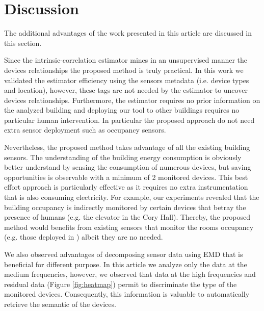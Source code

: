 \section{Discussion}
The additional advantages of the work presented in this article are discussed in this section.

Since the intrinsic-correlation estimator mines in an unsupervised manner the devices relationships the proposed method is truly practical. 
In this work we validated the estimator efficiency using the sensors metadata (i.e. device types and location), however, these tags are not needed by the estimator to uncover devices relationships.
Furthermore, the estimator requires no prior information on the analyzed building and deploying our tool to other buildings requires no particular human intervention.
In particular the proposed approach do not need extra sensor deployment such as occupancy sensors. 

Nevertheless, the proposed method takes advantage of all the existing building sensors.
The understanding of the building energy consumption is obviously better understand by sensing the consumption of numerous devices, 
but saving opportunities is observable with a minimum of 2 monitored devices.
This best effort approach is particularly effective as it requires no extra instrumentation that is also consuming electricity.
For example, our experiments revealed that the building occupancy is indirectly monitored by certain devices that betray the presence of humans (e.g. the elevator in the Cory Hall). 
Thereby, the proposed method would benefits from existing sensors that monitor the rooms occupancy (e.g. those deployed in \cite{agarwal:ipsn2011,erickson:ipsn2011}) albeit they are no needed.


We also observed advantages of decomposing sensor data using EMD that is beneficial for different purpose.
In this article we analyze only the data at the medium frequencies, however, we observed that data at the high frequencies and residual data (Figure \ref{fig:heatmap}) permit to discriminate the type of the monitored devices.
Consequently, this information is valuable to automatically retrieve the semantic of the devices.


% 
% 


